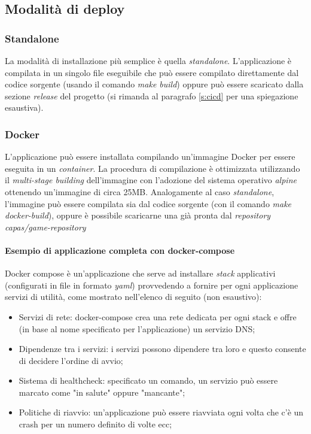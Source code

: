 \documentclass{article}
\begin{document}
\subsection{Modalità di deploy}
\subsubsection{Standalone}
La modalità di installazione più semplice è quella \textit{standalone}. L'applicazione è compilata in un singolo file eseguibile che può essere compilato direttamente dal codice sorgente (usando il comando \textit{make build}) oppure può essere scaricato dalla sezione \textit{release} del progetto (si rimanda al paragrafo \cref{s:cicd} per una spiegazione esaustiva). 

\subsubsection{Docker}
L'applicazione può essere installata compilando un'immagine Docker per essere eseguita in un \textit{container}. La procedura di compilazione è ottimizzata utilizzando il \textit{multi-stage building} dell'immagine con l'adozione del sistema operativo \textit{alpine} ottenendo un'immagine di circa 25MB. Analogamente al caso \textit{standalone}, l'immagine può essere compilata sia dal codice sorgente (con il comando \textit{make docker-build}), oppure è possibile scaricarne una già pronta dal \textit{repository capas/game-repository}

\paragraph{Esempio di applicazione completa con docker-compose}
Docker compose è un'applicazione che serve ad installare \textit{stack} applicativi  (configurati in file in formato \textit{yaml}) provvedendo a fornire per ogni applicazione servizi di utilità, come mostrato nell'elenco di seguito (non esaustivo):
\begin{itemize}
    \item Servizi di rete: docker-compose crea una rete dedicata per ogni stack e offre (in base al nome specificato per l'applicazione) un servizio DNS;
    \item Dipendenze tra i servizi: i servizi possono dipendere tra loro e questo consente di decidere l'ordine di avvio;
    \item Sistema di healthcheck: specificato un comando, un servizio può essere marcato come "in salute" oppure "mancante";
    \item Politiche di riavvio: un'applicazione può essere riavviata ogni volta che c'è un crash per un numero definito di volte ecc;
\end{itemize}
\end{document}
